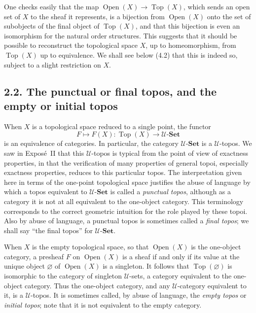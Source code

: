 \documentclass[11pt]{article}
\newcommand{\U}{\mathcal{U}}
\newcommand{\Set}{\mathbf{Set}}
\newcommand{\Top}{\operatorname{Top}}
\newcommand{\Open}{\operatorname{Open}}
\begin{document}
One checks easily that the map \(\Open(X)\to\Top(X)\), which sends an open set of \(X\) to the sheaf it represents, is a bijection from \(\Open(X)\) onto the set of subobjects of the final object of \(\Top(X)\), and that this bijection is even an isomorphism for the natural order structures. This suggests that it should be possible to reconstruct the topological space \(X\), up to homeomorphism, from \(\Top(X)\) up to equivalence. We shall see below (4.2) that this is indeed so, subject to a slight restriction on \(X\).

\subsection*{2.2. The punctual or final topos, and the empty or initial topos}
When \(X\) is a topological space reduced to a single point, the functor
\[
F\longmapsto F(X):\Top(X)\longrightarrow \U\text{-}\Set
\]
is an equivalence of categories. In particular, the category \(\U\text{-}\Set\) is a \(\U\)-topos. We saw in Expos\'e~II that this \(\U\)-topos is typical from the point of view of exactness properties, in that the verification of many properties of general topoi, especially exactness properties, reduces to this particular topos. The interpretation given here in terms of the one-point topological space justifies the abuse of language by which a topos equivalent to \(\U\text{-}\Set\) is called a \emph{punctual topos}, although as a category it is not at all equivalent to the one-object category. This terminology corresponds to the correct geometric intuition for the role played by these topoi. Also by abuse of language, a punctual topos is sometimes called a \emph{final topos}; we shall say ``the final topos'' for \(\U\text{-}\Set\).

When \(X\) is the empty topological space, so that \(\Open(X)\) is the one-object category, a presheaf \(F\) on \(\Open(X)\) is a sheaf if and only if its value at the unique object \(\varnothing\) of \(\Open(X)\) is a singleton. It follows that \(\Top(\varnothing)\) is isomorphic to the category of singleton \(\U\)-sets, a category equivalent to the one-object category. Thus the one-object category, and any \(\U\)-category equivalent to it, is a \(\U\)-topos. It is sometimes called, by abuse of language, the \emph{empty topos} or \emph{initial topos}; note that it is not equivalent to the empty category.
\end{document}
